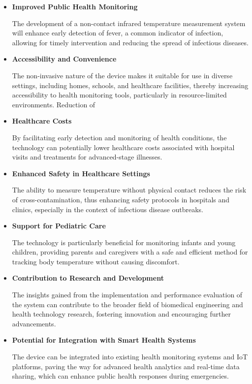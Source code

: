\documentclass{article}
\begin{document}
\begin{itemize}
\item
  \textbf{Improved Public Health Monitoring}

  The development of a non-contact infrared temperature measurement
  system will enhance early detection of fever, a common indicator of
  infection, allowing for timely intervention and reducing the spread of
  infectious diseases.
\item
  \textbf{Accessibility and Convenience}

  The non-invasive nature of the device makes it suitable for use in
  diverse settings, including homes, schools, and healthcare facilities,
  thereby increasing accessibility to health monitoring tools,
  particularly in resource-limited environments. Reduction of
\item
  \textbf{Healthcare Costs}

  By facilitating early detection and monitoring of health conditions,
  the technology can potentially lower healthcare costs associated with
  hospital visits and treatments for advanced-stage illnesses.
\item
  \textbf{Enhanced Safety in Healthcare Settings}

  The ability to measure temperature without physical contact reduces
  the risk of cross-contamination, thus enhancing safety protocols in
  hospitals and clinics, especially in the context of infectious disease
  outbreaks.
\item
  \textbf{Support for Pediatric Care}

  The technology is particularly beneficial for monitoring infants and
  young children, providing parents and caregivers with a safe and
  efficient method for tracking body temperature without causing
  discomfort.
\item
  \textbf{Contribution to Research and Development}

  The insights gained from the implementation and performance evaluation
  of the system can contribute to the broader field of biomedical
  engineering and health technology research, fostering innovation and
  encouraging further advancements.
\item
  \textbf{Potential for Integration with Smart Health Systems}

  The device can be integrated into existing health monitoring systems
  and IoT platforms, paving the way for advanced health analytics and
  real-time data sharing, which can enhance public health responses
  during emergencies.
\end{itemize}
\end{document}
